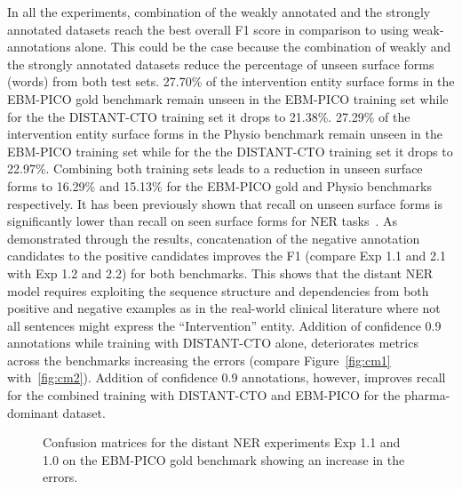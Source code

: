 \documentclass[letterpaper]{article} %
\begin{document}
In all the experiments, combination of the weakly annotated and the strongly annotated datasets reach the best overall F1 score in comparison to using weak-annotations alone.
This could be the case because the combination of weakly and the strongly annotated datasets reduce the percentage of unseen surface forms (words) from both test sets.
27.70\% of the intervention entity surface forms in the EBM-PICO gold benchmark remain unseen in the EBM-PICO training set while for the the DISTANT-CTO training set it drops to 21.38\%.
27.29\% of the intervention entity surface forms in the Physio benchmark remain unseen in the EBM-PICO training set while for the the DISTANT-CTO training set it drops to 22.97\%.
Combining both training sets leads to a reduction in unseen surface forms to 16.29\% and 15.13\% for the EBM-PICO gold and Physio benchmarks respectively.
It has been previously shown that recall on unseen surface forms is significantly lower than recall on seen surface forms for NER tasks~\cite{augenstein2017generalisation}.
As demonstrated through the results, concatenation of the negative annotation candidates to the positive candidates improves the F1 (compare Exp 1.1 and 2.1 with Exp 1.2 and 2.2) for both benchmarks.
This shows that the distant NER model requires exploiting the sequence structure and dependencies from both positive and negative examples as in the real-world clinical literature where not all sentences might express the ``Intervention'' entity.
Addition of confidence 0.9 annotations while training with DISTANT-CTO alone, deteriorates metrics across the benchmarks increasing the errors (compare Figure~\ref{fig:cm1} with~\ref{fig:cm2}).
Addition of confidence 0.9 annotations, however, improves recall for the combined training with DISTANT-CTO and EBM-PICO for the pharma-dominant dataset.
%
%
\begin{figure}[!tbp]
  \centering
  \hfill
  \caption{Confusion matrices for the distant NER experiments Exp 1.1 and 1.0 on the EBM-PICO gold benchmark showing an increase in the errors.}
\end{figure}
%
\end{document}
